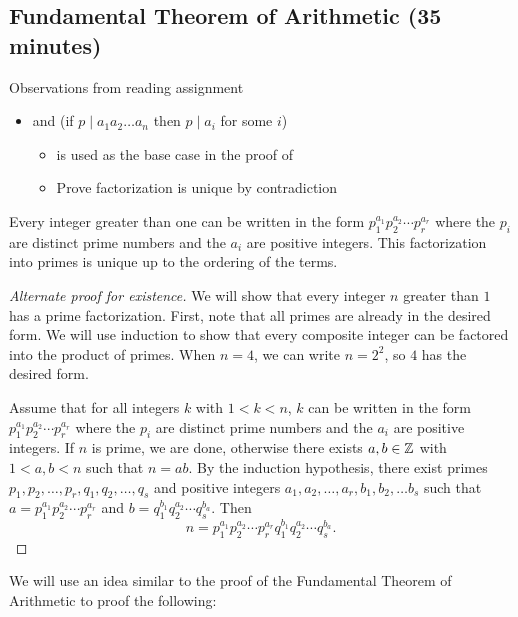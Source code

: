 \documentclass{ximera}
\begin{document}
\subsection{Fundamental Theorem of Arithmetic (35 minutes)}

Observations from reading assignment
\begin{itemize}
 \item {} and  (if $p\mid a_1a_2\dots a_n$ then $p\mid a_i$ for some $i$)
\begin{itemize}
\item {} is used as the base case in the proof of 
 \item Prove factorization is unique by contradiction
\end{itemize}
\end{itemize}

\begin{thm*}\label{FTA}
	Every integer greater than one can be written in the form $p_1^{a_1}p_2^{a_2}\cdots p_r^{a_r}$ where the $p_i$ are distinct prime numbers and the $a_i$ are positive integers. This factorization into primes is unique up to the ordering of the terms.
\end{thm*}
\begin{proof}[Alternate proof for existence]
 We will show that every integer $n$ greater than $1$ has a prime factorization. First, note that all primes are already in the desired form. We will use induction to show that every composite integer can be factored into the product of primes. When $n=4$, we can write $n=2^2$, so $4$ has the desired form.
 
Assume that for all integers $k$ with $1<k<n$, $k$ can be written in the form  $p_1^{a_1}p_2^{a_2}\cdots p_r^{a_r}$ where the $p_i$ are distinct prime numbers and the $a_i$ are positive integers. If $n$ is prime, we are done, otherwise there exists $a,b\in\mathbb Z$ with $1<a,b<n$ such that $n=ab$. By the induction hypothesis, there exist primes $p_1,p_2,\dots,p_r,q_1,q_2,\dots,q_s$ and positive integers $a_1,a_2,\dots,a_r,b_1,b_2,\dots b_s$ such that $a=p_1^{a_1}p_2^{a_2}\cdots p_r^{a_r}$ and $b=q_1^{b_1}q_2^{a_2}\cdots q_s^{b_a}$. Then \[n=p_1^{a_1}p_2^{a_2}\cdots p_r^{a_r}q_1^{b_1}q_2^{a_2}\cdots q_s^{b_a}.\]
\end{proof}

We will use an idea similar to the proof of the Fundamental Theorem of Arithmetic to proof the following:
\end{document}
